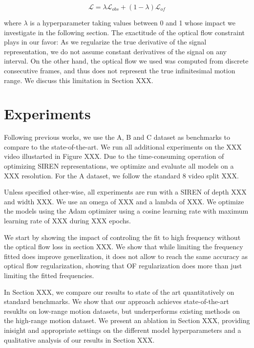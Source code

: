 \documentclass{article}
\begin{document}
\begin{equation}
\mathcal{L} = \lambda \mathcal{L}_{obs} + (1-\lambda) \mathcal{L}_{of}
\end{equation}

where $\lambda$ is a hyperparameter taking values between 0 and 1 whose impact we investigate in the following section.
The exactitude of the optical flow constraint plays in our favor:
As we regularize the true derivative of the signal representation, we do not assume constant derivatives of the signal on any interval.
On the other hand, the optical flow we used was computed from discrete consecutive frames, 
and thus does not represent the true infinitesimal motion range.
We discuss this limitation in Section XXX.

\section{Experiments}

Following previous works, we use the A, B and C dataset as benchmarks to compare to the state-of-the-art.
We run all additional experiments on the XXX video illustarted in Figure XXX.
Due to the time-consuming operation of optimizing SIREN representations, we optimize and evaluate all models on a XXX resolution.
For the A dataset, we follow the standard 8 video split XXX.

Unless specified other-wise, all experiments are run with a SIREN of depth XXX and width XXX.
We use an omega of XXX and a lambda of XXX.
We optimize the models using the Adam optimizer using a cosine learning rate with maximum learning rate of XXX during XXX epochs.

We start by showing the impact of controling the fit to high frequency without the optical flow loss in section XXX.
We show that while limiting the frequency fitted does improve generlization, it does not allow to reach 
the same accuracy as optical flow regularization, showing that OF regularization does more than just limiting the fitted frequencies.

In Section XXX, we compare our results to state of the art quantitatively on standard benchmarks.
We show that our approach achieves state-of-the-art resuklts on low-range motion datasets, but underperforms existing methods on the high-range motion dataset.
We present an ablation in Section XXX, providing inisight and appropriate settings on the different model hyperparameters and a qualitative analysis of our results in Section XXX.
\end{document}
